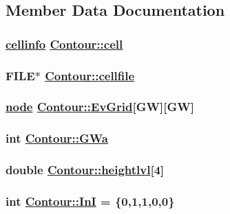 \subsection{Member Data Documentation}
\hypertarget{classContour_o8}{
\subsubsection[cell]{\setlength{\rightskip}{0pt plus 5cm}\hyperlink{structcellinfo}{cellinfo} \hyperlink{classContour_o8}{Contour::cell}}}
\label{classContour_o8}


\hypertarget{classContour_o20}{
\subsubsection[cellfile]{\setlength{\rightskip}{0pt plus 5cm}FILE$\ast$ \hyperlink{classContour_o20}{Contour::cellfile}}}
\label{classContour_o20}


\hypertarget{classContour_o14}{
\subsubsection[EvGrid]{\setlength{\rightskip}{0pt plus 5cm}\hyperlink{structnode}{node} \hyperlink{classContour_o14}{Contour::Ev\-Grid}\mbox{[}GW\mbox{]}\mbox{[}GW\mbox{]}}}
\label{classContour_o14}


\hypertarget{classContour_o0}{
\subsubsection[GWa]{\setlength{\rightskip}{0pt plus 5cm}int \hyperlink{classContour_o0}{Contour::GWa}}}
\label{classContour_o0}


\hypertarget{classContour_o15}{
\subsubsection[heightlvl]{\setlength{\rightskip}{0pt plus 5cm}double \hyperlink{classContour_o15}{Contour::heightlvl}\mbox{[}4\mbox{]}}}
\label{classContour_o15}


\hypertarget{classContour_s0}{
\subsubsection[InI]{\setlength{\rightskip}{0pt plus 5cm}int \hyperlink{classContour_s0}{Contour::In\-I} = \{0,1,1,0,0\}}}
\label{classContour_s0}


